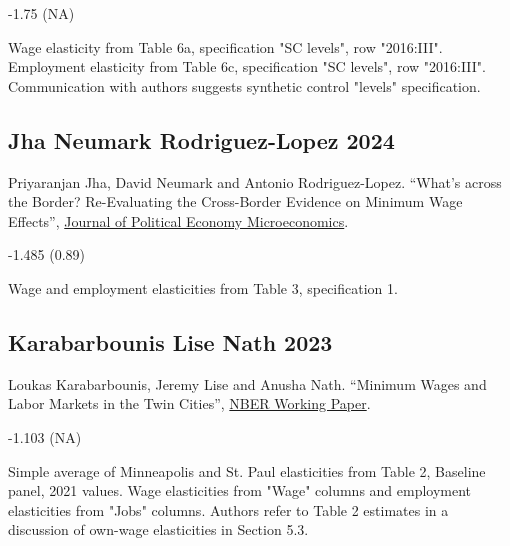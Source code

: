 \vspace{0.7em}

 -1.75 (NA)

\vspace{0.7em}

 Wage elasticity from Table 6a, specification "SC levels", row "2016:III". Employment elasticity from Table 6c, specification "SC levels", row "2016:III". Communication with authors suggests synthetic control "levels" specification.

\subsection*{Jha Neumark Rodriguez-Lopez 2024}
\vspace{-0.7em}

\noindent Priyaranjan Jha, David Neumark and Antonio Rodriguez-Lopez. ``What's across the Border? Re-Evaluating the Cross-Border Evidence on Minimum Wage Effects'', \href{https://sites.socsci.uci.edu/~jantonio/Papers/minwage_czones.pdf}{Journal of Political Economy Microeconomics}.

\vspace{0.7em}

 -1.485 (0.89)

\vspace{0.7em}

 Wage and employment elasticities from Table 3, specification 1.

\subsection*{Karabarbounis Lise Nath 2023}
\vspace{-0.7em}

\noindent Loukas Karabarbounis, Jeremy Lise and Anusha Nath. ``Minimum Wages and Labor Markets in the Twin Cities'', \href{https://www.nber.org/system/files/working_papers/w30239/w30239.pdf}{NBER Working Paper}.

\vspace{0.7em}

 -1.103 (NA)

\vspace{0.7em}

 Simple average of Minneapolis and St. Paul elasticities from Table 2, Baseline panel, 2021 values. Wage elasticities from "Wage" columns and employment elasticities from "Jobs" columns. Authors refer to Table 2 estimates in a discussion of own-wage elasticities in Section 5.3.

